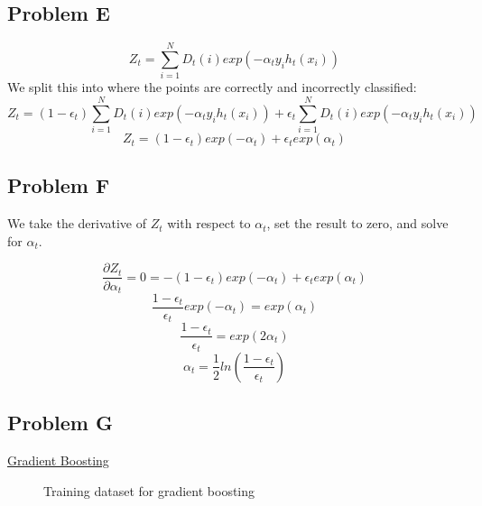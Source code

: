\documentclass[12pt]{article} %
\begin{document}
\subsection{Problem E}
$$Z_t = \sum_{i=1}^ND_t(i)exp(-\alpha_ty_ih_t(x_i))$$
We split this into where the points are correctly and incorrectly classified:
$$Z_t = (1-\epsilon_t) \sum_{i=1}^ND_t(i)exp(-\alpha_ty_ih_t(x_i)) + \epsilon_t\sum_{i=1}^ND_t(i)exp(-\alpha_ty_ih_t(x_i))$$
$$Z_t = (1-\epsilon_t) exp(-\alpha_t) + \epsilon_t exp(\alpha_t)$$

\subsection{Problem F}
We take the derivative of $Z_t$ with respect to $\alpha_t$, set the result to zero, and solve for $\alpha_t$.

$$\frac{\partial Z_t}{\partial\alpha_t} = 0 = - (1-\epsilon_t)exp(-\alpha_t) + \epsilon_t exp(\alpha_t)$$
$$\frac{1-\epsilon_t}{\epsilon_t} exp(-\alpha_t) = exp(\alpha_t)$$
$$\frac{1-\epsilon_t}{\epsilon_t} = exp(2\alpha_t)$$
$$\alpha_t = \frac{1}{2}ln(\frac{1-\epsilon_t}{\epsilon_t})$$

\newpage
\subsection{Problem G}

\underline{Gradient Boosting}
\begin{figure}[H]
	\vspace{-10mm}
	\caption{Training dataset for gradient boosting}
\end{figure}
\end{document}

